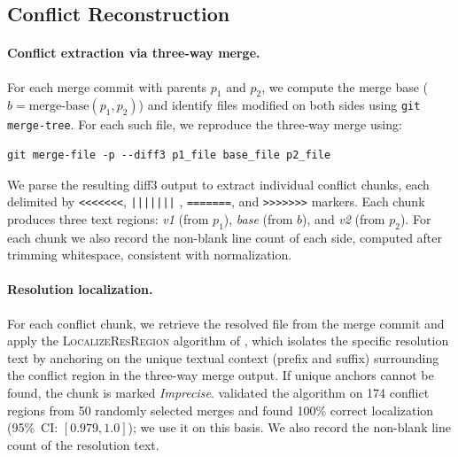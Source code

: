 \documentclass[sigconf,anonymous]{acmart}
\begin{document}
\subsection{Conflict Reconstruction}
\label{sec:meth-conflicts}

\paragraph{Conflict extraction via three-way merge.}
For each merge commit with parents $p_1$ and $p_2$, we compute the merge base ($b = \text{merge-base}(p_1, p_2)$) and identify files modified on both sides using \texttt{git merge-tree}. For each such file, we reproduce the three-way merge using:

\begin{verbatim}
git merge-file -p --diff3 p1_file base_file p2_file
\end{verbatim}

We parse the resulting diff3 output to extract individual conflict chunks, each delimited by \verb|<<<<<<<|, \verb+|||||||+ , \verb|=======|, and \verb|>>>>>>>| markers. Each chunk produces three text regions: \textit{v1} (from $p_1$), \textit{base} (from $b$), and \textit{v2} (from $p_2$). For each chunk we also record the non-blank line count of each side, computed after trimming whitespace, consistent with \citet{ghiotto2020nature} normalization.

\paragraph{Resolution localization.}
\label{sec:meth-resolution}

For each conflict chunk, we retrieve the resolved file from the merge commit and apply the \textsc{LocalizeResRegion} algorithm of \citet{dinella2022deepmerge}, which isolates the specific resolution text by anchoring on the unique textual context (prefix and suffix) surrounding the conflict region in the three-way merge output. If unique anchors cannot be found, the chunk is marked \emph{Imprecise}. \citet{dinella2022deepmerge} validated the algorithm on 174 conflict regions from 50 randomly selected merges and found 100\% correct localization (95\%~CI: $[0.979, 1.0]$); we use it on this basis. We also record the non-blank line count of the resolution text.
\end{document}
